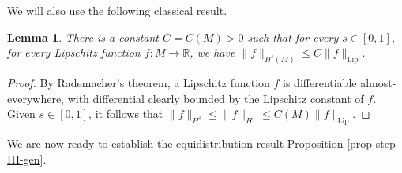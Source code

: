\documentclass[11pt, leqno, fleqn]{amsart}
\newcommand{\margem}[1]{\marginpar{{\scriptsize {#1}}}}
\def\clr{   \color{red}}
\def \R{{\mathbb R}}
\DeclareMathOperator{\Lip}{Lip}
\newtheorem{lemma}[thm]{\bf Lemma}
\theoremstyle{definition}
\theoremstyle{definition}
\begin{document}
We will also use the following classical result.
 \begin{lemma}\label{Hs-appr}
There is a constant $C = C(M) > 0$ such that for every $s \in [0, 1]$, for every Lipschitz function $f : M \rightarrow \R$, we have  $\| f \|_{H^s(M)}\leq  C \| f \|_{\Lip}$.
 \end{lemma}
 \begin{proof}
 	By Rademacher's theorem, a Lipschitz function $f$ is differentiable almost-everywhere, with differential clearly bounded  by the Lipschitz constant of $f$.  Given $s\in [0, 1]$, it follows that $\|f\|_{H^s}\leq \|f\|_{H^1}\leq C(M) \|f\|_{\Lip}$.
 \end{proof}


	
	We are now ready to establish the equidistribution result Proposition \ref{prop step III-gen}.
	
\end{document}
